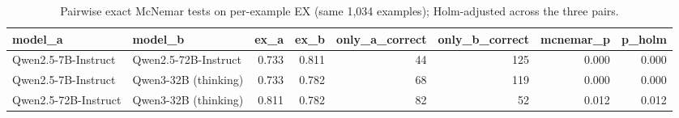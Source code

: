 \begin{table}[htbp]
\caption{Pairwise exact McNemar tests on per-example EX (same 1,034 examples); Holm-adjusted across the three pairs.}
\label{tab:task1_pairwise_mcnemar}
\begin{tabular}{llrrrrrr}
\toprule
model\_a & model\_b & ex\_a & ex\_b & only\_a\_correct & only\_b\_correct & mcnemar\_p & p\_holm \\
\midrule
Qwen2.5-7B-Instruct & Qwen2.5-72B-Instruct & 0.733 & 0.811 & 44 & 125 & 0.000 & 0.000 \\
Qwen2.5-7B-Instruct & Qwen3-32B (thinking) & 0.733 & 0.782 & 68 & 119 & 0.000 & 0.000 \\
Qwen2.5-72B-Instruct & Qwen3-32B (thinking) & 0.811 & 0.782 & 82 & 52 & 0.012 & 0.012 \\
\bottomrule
\end{tabular}
\end{table}
